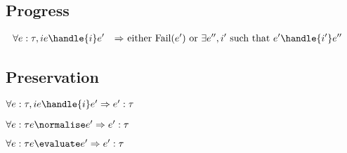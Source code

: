 \subsection{Progress}

\begin{align*}
  \forall e:\tau,i & e \handle{i} e' &\implies& \text{ either Fail}(e') \text{ or } \exists e'',i' \text{ such that } e'\handle{i'}e''&\\
\end{align*}

\subsection{Preservation}

\begin{theorem}
  $\forall e:\tau,i  e \handle{i} e' \implies e':\tau$
\end{theorem}

\begin{theorem}
    $\forall e:\tau  e \normalise e' \implies e':\tau$
    \label{thmpresnorm}
\end{theorem}

\begin{theorem}
      $\forall e:\tau  e \evaluate e' \implies e':\tau$
      \label{thmpreseval}
\end{theorem}


